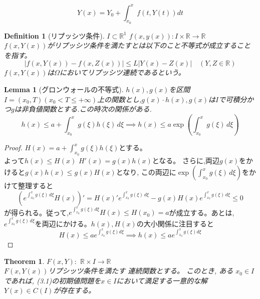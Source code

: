 \documentclass[a4paper]{article}
\newtheorem{Lemma}{Lemma}       %
\newtheorem{Definition}{Definition}   %
\newtheorem{Theorem}{Theorem}   %
\begin{document}
    \[Y(x)=Y_{0}+\displaystyle \int_{x_{0}}^{x} f(t,Y(t)) dt\]

    \begin{Definition}[リプッシツ条件]
        $I \subset \mathbb{R}^{1}$
        $f(x,y(x)): I \times \mathbb{R} \to \mathbb{R}$\\
        $f(x,Y(x))$がリプッシツ条件を満たすとは以下のこと不等式が成立することを指す。
        \[
        |f(x, Y(x))- f(x, Z(x))| \leq L |Y(x) - Z(x)| \quad (Y,Z \in \mathbb{R}) 
        \]
        $f(x,Y(x))$は$\Omega$においてリプッシツ連続であるという。
    \end{Definition}

    \begin{Lemma}[グロンウォールの不等式]
        $h(x),g(x)$を区間$I=(x_{0},T)(x_{0}<T\leq +\infty)$上の関数とし,$g(x)\cdot h(x),g(x)$は$I$で可積分かつ$g$は非負値関数とする.この時次の関係がある.
        \[
        h(x) \leq a + \int_{x_0}^x g(\xi) h(\xi) \, d\xi \implies 
        h(x) \leq a \exp\left(\int_{x_0}^x g(\xi) \, d\xi\right)
        \]
    \end{Lemma}

    \begin{proof}
        $H(x)=a+\displaystyle\int_{x_0}^x g(\xi) h(\xi)$とする。\\
        よって$h(x)\leq H(x)$
        $H'(x)=g(x)h(x)$となる。
        さらに,両辺$g(x)$をかけると$g(x)h(x)\leq g(x)H(x)$となり, この両辺に$\exp\left(\int_{x_0}^x g(\xi) \, d\xi\right)$をかけて整理すると
        \[\left(e^{\int_{x_0}^x g(\xi) \, d\xi}H(x)\right)'=H(x)'e^{\int_{x_0}^x g(\xi) \, d\xi}-g(x)H(x)e^{\int_{x_0}^x g(\xi) \, d\xi} \leq 0\]
        が得られる。従って,$e^{\int_{x_0}^x g(\xi) \, d\xi}H(x) \leq H(x_{0})=a$が成立する。あとは,$e^{\int_{x_0}^x g(\xi) \, d\xi}$を両辺にかける。$h(x),H(x)$の大小関係に注目すると
        \[H(x) \leq ae^{\int_{x_{0}}^{x} g(\xi) d\xi} \implies h(x) \leq ae^{\int_{x_{0}}^{x} g(\xi) d\xi}\]
    \end{proof}

    \begin{Theorem}
        $F(x, Y):$  $\mathbb{R}\times I \to \mathbb{R}$ \\
        $F(x,Y(x))$リプシッツ条件を満たす 連続関数とする。
        このとき, ある $x_0 \in I$ であれば, (3.1)の初期値問題を$x \in I$において満足する一意的な解$Y(x)\in C(I)$が存在する。
    \end{Theorem}
\end{document}
